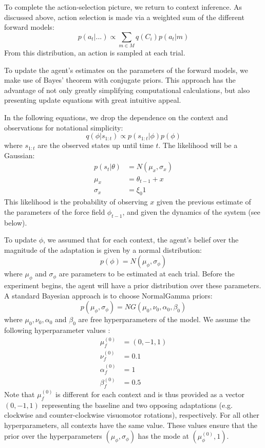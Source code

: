 \documentclass[a4paper,doc,floatsintext,natbib]{apa6}
\begin{document}
To complete the action-selection picture, we return to context inference. As
discussed above, action selection is made via a weighted sum of the different
forward models:
\begin{equation}
p(a_t | ...) \propto \displaystyle \sum_{m \in M} q(C_i)p(a_t | m)
\end{equation}
From this distribution, an action is sampled at each trial.

To update the agent's estimates on the parameters of the forward models, we
make use of Bayes' theorem with conjugate priors. This approach has the
advantage of not only greatly simplifying computational calculations, but also
presenting update equations with great intuitive appeal.

In the following equations, we drop the dependence on the context and
observations for notational simplicity:
\begin{equation}
q(\phi | s_{1:t}) \propto p(s_{1:t} | \phi)p(\phi)
\end{equation}
where $s_{1:t}$ are the observed states up until time $t$. The likelihood will
be a Gaussian:
\begin{align}
  p(s_t | \theta) &= N(\mu_x, \sigma_x)  \\
  \mu_x &= \theta_{t-1} + x \\
  \sigma_x &= \xi_0 1
\end{align}
This likelihood is the probability of observing $x$ given the previous estimate
of the parameters of the force field $\phi_{t-1}$, and given the dynamics of
the system (see below).

To update $\phi$, we assumed that for each context, the agent's belief over
the magnitude of the adaptation is given by a normal distribution:
\begin{equation}
p(\phi) = N(\mu_\phi, \sigma_\phi) \label{eqn:data-dist}
\end{equation}
where $\mu_\phi$ and $\sigma_\phi$ are parameters to be estimated at each
trial. Before the experiment begins, the agent will have a prior distribution
over these parameters. A standard Bayesian approach is to choose NormalGamma
priors:
\begin{equation}
p(\mu_\phi, \sigma_\phi) = NG(\mu_0, \nu_0, \alpha_0, \beta_0)
\end{equation}
where $\mu_0, \nu_0, \alpha_0$ and $\beta_0$ are free hyperparameters of the
model. We assume the following hyperparameter values :
\begin{align} \mu_f^{(0)} &= (0, -1, 1) \\
  \nu_f^{(0)} &= 0.1 \\
  \alpha_f^{(0)} &= 1 \\
  \beta_f^{(0)} &= 0.5
\end{align}
Note that $\mu_f^{(0)}$ is different for each context and is thus provided as a
vector $(0, -1, 1)$ representing the baseline and two opposing adaptations
(e.g. clockwise and counter-clockwise visuomotor rotations), respectively. For
all other hyperparameters, all contexts have the same value. These values
ensure that the prior over the hyperparameters $(\mu_\phi, \sigma_\phi)$ has the mode
at $(\mu_\phi^{(0)}, 1)$.
\end{document}
